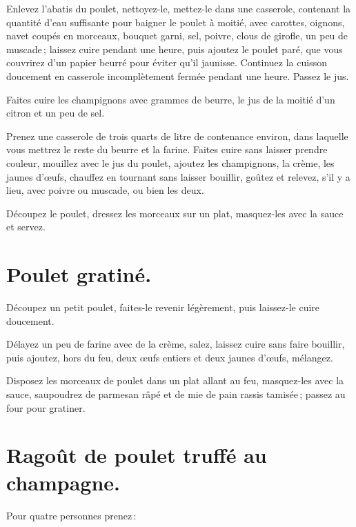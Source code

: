 Enlevez l'abatis du poulet, nettoyez-le, mettez-le dans une casserole,
contenant la quantité d'eau suffisante pour baigner le poulet à moitié, avec
carottes, oignons, navet coupés en morceaux, bouquet garni, sel, poivre, clous
de girofle, un peu de muscade ; laissez cuire pendant une heure, puis ajoutez
le poulet paré, que vous couvrirez d'un papier beurré pour éviter qu'il
jaunisse. Continuez la cuisson doucement en casserole incomplètement fermée
pendant une heure. Passez le jus.

Faites cuire les champignons avec {\mmm} grammes de beurre, le jus de la moitié
d'un citron et un peu de sel.

Prenez une casserole de trois quarts de litre de contenance environ, dans
laquelle vous mettrez le reste du beurre et la farine. Faites cuire sans
laisser prendre couleur, mouillez avec le jus du poulet, ajoutez les
champignons, la crème, les jaunes d'œufs, chauffez en tournant sans laisser
bouillir, goûtez et relevez, s'il y a lieu, avec poivre ou muscade, ou bien les
deux.

Découpez le poulet, dressez les morceaux sur un plat, masquez-les avec la
sauce et servez.

\section*{\centering Poulet gratiné.}
{}

Découpez un petit poulet, faites-le revenir légèrement, puis laissez-le cuire
doucement.

Délayez un peu de farine avec de la crème, salez, laissez cuire sans faire
bouillir, puis ajoutez, hors du feu, deux œufs entiers et deux jaunes d'œufs,
mélangez.

Disposez les morceaux de poulet dans un plat allant au feu, masquez-les avec la
sauce, saupoudrez de parmesan râpé et de mie de pain rassis tamisée ; passez au
four pour gratiner.

\section*{\centering Ragoût de poulet truffé au champagne.}
{}

Pour quatre personnes prenez :

\medskip

